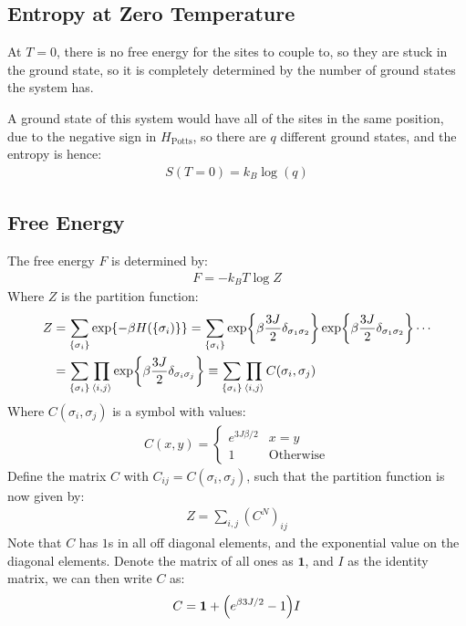 \subsection{Entropy at Zero Temperature}
At $T=0$, there is no free energy for the sites to couple to, so they are stuck in the ground state, so it is completely determined by the number of ground states the system has.

A ground state of this system would have all of the sites in the same position, due to the negative sign in $H_{\text{Potts}}$, so there are $q$ different ground states, and the entropy is hence:
\begin{align}
  \boxed{S(T=0)=k_B\log(q)}
\end{align}

\subsection{Free Energy}
The free energy $F$ is determined by:
\begin{align*}
  F=-k_BT\log Z
\end{align*}
Where $Z$ is the partition function:
\begin{align*}
  Z&=\sum_{\{\sigma_i\}}\exp{-\beta H(\{\sigma_i)\}}
  =\sum_{\{\sigma_i\}}\exp{\beta\frac{3J}2\delta_{\sigma_1\sigma_2}}
  \exp{\beta\frac{3J}2\delta_{\sigma_1\sigma_2}}\cdots\\
  &=\sum_{\{\sigma_i\}}\prod_{\ev{i,j}}
  \exp{\beta\frac{3J}2\delta_{\sigma_i\sigma_j}}
  \equiv\sum_{\{\sigma_i\}}\prod_{\ev{i,j}}C(\sigma_i,\sigma_j)
\end{align*}
Where $C(\sigma_i,\sigma_j)$ is a symbol with values:
\begin{align*}
  C(x,y)=
  \begin{cases}
    e^{3J\beta/2} & x=y\\
    1 & \text{Otherwise}
  \end{cases}
\end{align*}
Define the matrix $C$ with $C_{ij}=C(\sigma_i,\sigma_j)$, such that the partition function is now given by:
\begin{align*}
  Z=\sum_{i,j}(C^N)_{ij}
\end{align*}
Note that $C$ has $1$s in all off diagonal elements, and the exponential value on the diagonal elements. Denote the matrix of all ones as $\bm{1}$, and $I$ as the identity matrix, we can then write $C$ as:
\begin{align*}
  C=\bm{1}+\qty(e^{\beta3J/2}-1)I
\end{align*}
